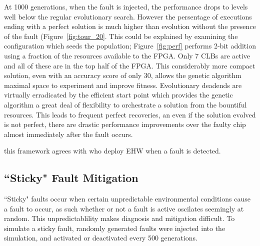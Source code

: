 At 1000 generations, when the fault is injected, the performance drops to levels
well below the regular evolutionary search. However the persentage of executions
ending with a perfect solution is much higher than evolution without the presence
of the fault (Figure~\ref{fig:tour_20}. This could be explained by examining the configuration which seeds
the population; Figure~\ref{fig:perf} performs 2-bit addition using a fraction of the
resources available to the FPGA. Only 7 CLBs are active and all of these are in the top
half of the FPGA. This considerably more compact solution, even with an accuracy score
of only 30, allows the genetic algorithm maximal space to experiment and improve fitness.
Evolutionary deadends are virtually
erradicated by the efficient start point which provides the genetic algorithm a great
deal of flexibility to orchestrate a solution from the bountiful resources.
This leads to frequent perfect recoveries, an even if the solution evolved is not perfect,
there are drastic performance improvements over the faulty chip almost immediately after
the fault occurs.

\todo this framework agrees with \cite{10.1007/3-540-61093-6_6} who deploy EHW when
a fault is detected.

\subsection{``Sticky" Fault Mitigation}
``Sticky" faults occur when certain unpredictable environmental conditions cause
a fault to occur, as such whether or not a fault is active oscilates seemingly at
random. This unpredictablility makes diagnosis and mitigation difficult.
To simulate a sticky fault, randomly generated faults were injected into the simulation,
and activated
or deactivated every 500 generations. 

